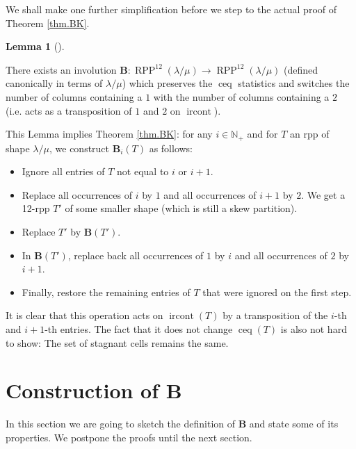 \documentclass[numbers=enddot,12pt,final,onecolumn,notitlepage]{scrartcl}%
\theoremstyle{definition}
\newtheorem{lem}[theo]{Lemma}
\newenvironment{lemma}[1][]
{\begin{lem}[#1]\begin{leftbar}}
{\end{leftbar}\end{lem}}
\newcommand{\Nplus}{\mathbb{N}_{+}}
\def\ceq{{\operatorname*{ceq}}}
\def\ircont{{\operatorname*{ircont}}}
\def\lm{{\lambda/\mu}}
\def\B{{\mathbf{B}}}
\def\OneTwoRPP{{\operatorname*{RPP}^{12}\left(  \lambda/\mu\right)}}
\begin{document}
We shall make one further simplification before we step to the actual proof of
Theorem \ref{thm.BK}.

\begin{lemma}
\label{lem.BK} There exists an
involution $\mathbf{B}:\OneTwoRPP\rightarrow\OneTwoRPP$ (defined canonically
in terms of $\lm$) which preserves the $\ceq$ statistics and switches the number of columns containing a $1$ with the number of columns containing a $2$ (i.e. acts as a transposition of $1$ and $2$ on $\ircont$).
\end{lemma}




 This Lemma implies Theorem \ref{thm.BK}: for any $i\in\Nplus$ and for $T$ an rpp of shape $\lm$, we construct $\B_i(T)$ as follows: 
 \begin{itemize}
  \item Ignore all entries of $T$ not equal to $i$ or $i+1$. 
  \item Replace all occurrences of $i$ by $1$ and all occurrences of $i+1$ by $2$. We get a 12-rpp $T'$ of some smaller shape (which is still a skew partition).
  \item Replace $T'$ by $\B(T')$.
  \item In $\B(T')$, replace back all occurrences of $1$ by $i$ and all occurrences of $2$ by $i+1$.
  \item Finally, restore the remaining entries of $T$ that were ignored on the first step.
 \end{itemize}
 
 It is clear that this operation acts on $\ircont(T)$ by a transposition of the $i$-th and $i+1$-th entries. The fact that it does not change $\ceq(T)$ is also not hard to show: The set of stagnant cells remains the same.

\def\B{{\mathbf{B}}}

\section{Construction of $\mathbf{B}$\label{sect.construction}}
In this section we are going to sketch the definition of $\mathbf{B}$ and state some of its properties. We postpone the proofs until the next section.
\end{document}
